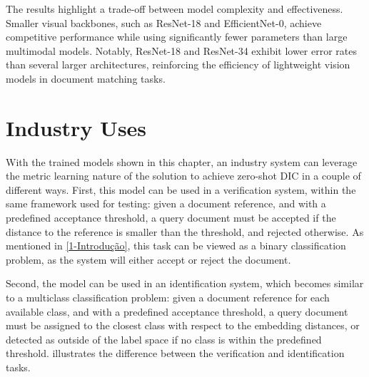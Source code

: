 The results highlight a trade-off between model complexity and effectiveness. Smaller visual backbones, such as ResNet-18 and EfficientNet-0, achieve competitive performance while using significantly fewer parameters than large multimodal models. Notably, ResNet-18 and ResNet-34 exhibit lower error rates than several larger architectures, reinforcing the efficiency of lightweight vision models in document matching tasks.

\section{Industry Uses}

With the trained models shown in this chapter, an industry system can leverage the metric learning nature of the solution to achieve zero-shot \gls{DIC} in a couple of different ways. First, this model can be used in a verification system, within the same framework used for testing: given a document reference, and with a predefined acceptance threshold, a query document must be accepted if the distance to the reference is smaller than the threshold, and rejected otherwise. As mentioned in \ref{1-Introdução}, this task can be viewed as a binary classification problem, as the system will either accept or reject the document.

Second, the model can be used in an identification system, which becomes similar to a multiclass classification problem: given a document reference for each available class, and with a predefined acceptance threshold, a query document must be assigned to the closest class with respect to the embedding distances, or detected as outside of the label space if no class is within the predefined threshold.  illustrates the difference between the verification and identification tasks.

